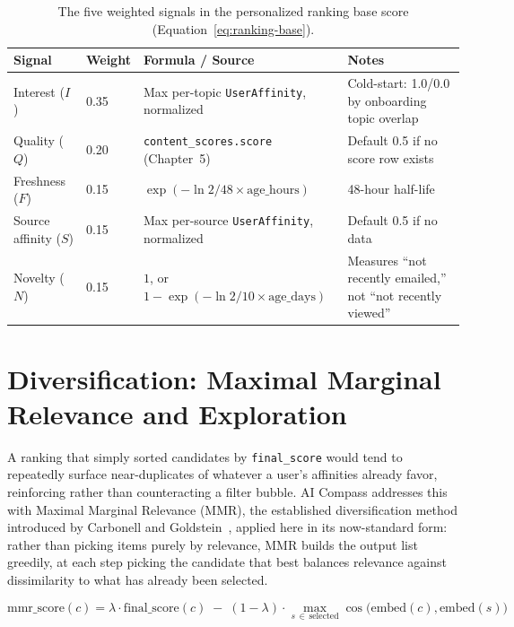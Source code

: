 \begin{table}[htbp]
\centering
\caption{The five weighted signals in the personalized ranking base score (Equation~\ref{eq:ranking-base}).}
\label{tab:ranking-signals}
\small
\begin{tabular}{|p{2.4cm}|p{1.3cm}|p{4.6cm}|p{4.8cm}|}
\hline
\textbf{Signal} & \textbf{Weight} & \textbf{Formula / Source} & \textbf{Notes} \\
\hline
Interest ($I$) & 0.35 & Max per-topic \texttt{UserAffinity}, normalized & Cold-start: 1.0/0.0 by onboarding topic overlap \\
\hline
Quality ($Q$) & 0.20 & \texttt{content\_scores.score} (Chapter~5) & Default 0.5 if no score row exists \\
\hline
Freshness ($F$) & 0.15 & $\exp(-\ln2/48 \times \text{age\_hours})$ & 48-hour half-life \\
\hline
Source affinity ($S$) & 0.15 & Max per-source \texttt{UserAffinity}, normalized & Default 0.5 if no data \\
\hline
Novelty ($N$) & 0.15 & $1$, or $1-\exp(-\ln2/10 \times \text{age\_days})$ & Measures ``not recently emailed,'' not ``not recently viewed'' \\
\hline
\end{tabular}
\end{table}

\section{Diversification: Maximal Marginal Relevance and Exploration}
\label{sec:rec-mmr}

A ranking that simply sorted candidates by \texttt{final\_score} would tend to repeatedly surface near-duplicates of whatever a user's affinities already favor, reinforcing rather than counteracting a filter bubble. AI Compass addresses this with Maximal Marginal Relevance (MMR), the established diversification method introduced by Carbonell and Goldstein~\cite{carbonell1998mmr}, applied here in its now-standard form: rather than picking items purely by relevance, MMR builds the output list greedily, at each step picking the candidate that best balances relevance against dissimilarity to what has already been selected.

\begin{equation}
\text{mmr\_score}(c) = \lambda \cdot \text{final\_score}(c) \;-\; (1-\lambda) \cdot \max_{s \,\in\, \text{selected}} \cos\bigl(\text{embed}(c), \text{embed}(s)\bigr)
\label{eq:mmr}
\end{equation}


